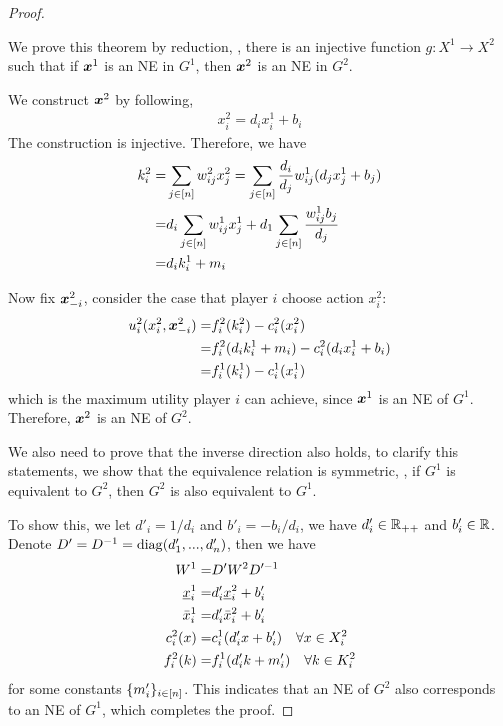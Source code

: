 \begin{proof}
\label{prf:thm:NE:unique:equivalence}

We prove this theorem by reduction, \ie, there is an injective function $g: X^1 \to X^2$ such that if ${\bm{x}}^1$ is an NE in $G^1$, then ${\bm{x}}^2$ is an NE in $G^2$.

We construct ${\bm{x}}^2$ by following,
\begin{align*}
    x^2_i = d_i x^1_i + b_i
\end{align*}
The construction is injective.
Therefore, we have 
\begin{align*}
    k^2_i =& \sum_{j\in[n]} w^2_{ij} x^2_j = \sum_{j\in[n]} \frac{d_i}{d_j}w^1_{ij} (d_j x^1_j + b_j)
    \\
    =& d_i \sum_{j\in[n]} w^1_{ij} x^1_j + d_1 \sum_{j\in[n]} \frac{w^1_{ij} b_j}{d_j}
    \\
    =& d_i k^1_i + m_i
\end{align*}

Now fix ${\bm{x}}^2_{-i}$, consider the case that player $i$ choose action $x^2_i$:
\begin{align*}
    u^2_i(x^2_i, {\bm{x}}^2_{-i}) =& f^2_i(k^2_i) - c^2_i(x^2_i)
    \\
    =& f^2_i(d_i k^1_i + m_i) - c^2_i(d_i x^1_i + b_i)
    \\
    =& f^1_i(k^1_i) - c^1_i(x^1_i)
\end{align*}
which is the maximum utility player $i$ can achieve, since ${\bm{x}}^1$ is an NE of $G^1$.
Therefore, ${\bm{x}}^2$ is an NE of $G^2$.

We also need to prove that the inverse direction also holds, to clarify this statements, we show that the equivalence relation is symmetric, \ie, if $G^1$ is equivalent to $G^2$, then $G^2$ is also equivalent to $G^1$.

To show this, we let $d'_i = 1/d_i$ and $b'_i = -b_i/d_i$, we have $d'_i \in \mathbb{R}_{++}$ and $b'_i \in \mathbb{R}$. 
Denote $D' = D^{-1} = \mathrm{diag}(d'_1,...,d'_n)$, then we have
\begin{align*}
    W^1 =& D' W^2 D'^{-1}
    \\
    \underline{x}^1_i =& d'_i \underline{x}^2_i + b'_i
    \\
    \bar{x}^1_i =& d'_i \bar{x}^2_i + b'_i
    \\
    c^2_i(x) =& c^1_i(d'_i x + b'_i)\quad\forall x \in X^2_i
    \\
    f^2_i(k) =& f^1_i(d'_i k + m'_i)\quad\forall k \in K^2_i
\end{align*}
for some constants $\{m'_i\}_{i\in[n]}$.
This indicates that an NE of $G^2$ also corresponds to an NE of $G^1$, which completes the proof.

\end{proof}